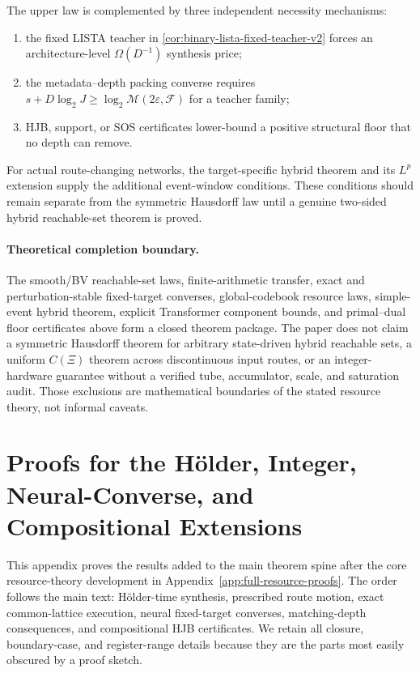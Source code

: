 \documentclass[twoside,11pt]{article}
\begin{document}
The upper law is complemented by three independent necessity mechanisms:
\begin{enumerate}[leftmargin=2em]
\item the fixed LISTA teacher in
\cref{cor:binary-lista-fixed-teacher-v2} forces an architecture-level
$\Omega(D^{-1})$ synthesis price;
\item the metadata--depth packing converse requires
$s+D\log_2J\ge\log_2\mathcal M(2\varepsilon,\mathcal F)$ for a teacher
family;
\item HJB, support, or SOS certificates lower-bound a positive structural
floor that no depth can remove.
\end{enumerate}
For actual route-changing networks, the target-specific hybrid theorem and
its $L^p$ extension supply the additional event-window conditions.  These
conditions should remain separate from the symmetric Hausdorff law until a
genuine two-sided hybrid reachable-set theorem is proved.



\paragraph{Theoretical completion boundary.}
The smooth/BV reachable-set laws, finite-arithmetic transfer, exact and
perturbation-stable fixed-target converses, global-codebook resource laws,
simple-event hybrid theorem, explicit Transformer component bounds, and
primal--dual floor certificates above form a closed theorem package.  The
paper does not claim a symmetric Hausdorff theorem for arbitrary state-driven
hybrid reachable sets, a uniform $C(\Xi)$ theorem across discontinuous input
routes, or an integer-hardware guarantee without a verified tube, accumulator,
scale, and saturation audit.  Those exclusions are mathematical boundaries of
the stated resource theory, not informal caveats.

\section{Proofs for the H\"older, Integer, Neural-Converse, and Compositional Extensions}
\label{app:merged-exact-proofs}

This appendix proves the results added to the main theorem spine after the
core resource-theory development in Appendix~\ref{app:full-resource-proofs}.
The order follows the main text: H\"older-time synthesis, prescribed route
motion, exact common-lattice execution, neural fixed-target converses,
matching-depth consequences, and compositional HJB certificates.  We retain
all closure, boundary-case, and register-range details because they are the
parts most easily obscured by a proof sketch.
\end{document}
